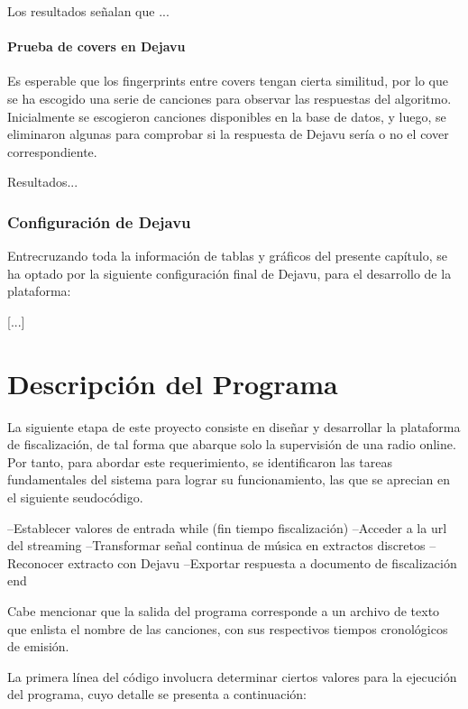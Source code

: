 Los resultados señalan que ... 

\paragraph{Prueba de covers en Dejavu}

Es esperable que los fingerprints entre covers tengan cierta similitud, por lo que se ha escogido una serie de canciones para observar las respuestas del algoritmo. Inicialmente se escogieron canciones disponibles en la base de datos, y luego, se eliminaron algunas para comprobar si la respuesta de Dejavu sería o no el cover correspondiente.

Resultados...

\subsubsection{Configuración de Dejavu}
Entrecruzando toda la información de tablas y gráficos del presente capítulo, se ha optado por la siguiente configuración final de Dejavu, para el desarrollo de la plataforma:

[...]


\section{Descripción del Programa}

La siguiente etapa de este proyecto consiste en diseñar y desarrollar la plataforma de fiscalización, de tal forma que abarque solo la supervisión de una radio online. Por tanto, para abordar este requerimiento, se identificaron las tareas fundamentales del sistema para lograr su funcionamiento, las que se aprecian en el siguiente seudocódigo.


--Establecer valores de entrada
while (fin tiempo fiscalización)
	--Acceder a la url del streaming
	--Transformar señal continua de música en extractos discretos
	--Reconocer extracto con Dejavu
	--Exportar respuesta a documento de fiscalización
end

Cabe mencionar que la salida del programa corresponde a un archivo de texto que enlista el nombre de las canciones, con sus respectivos tiempos cronológicos de emisión.

La primera línea del código involucra determinar ciertos valores para la ejecución del programa, cuyo detalle se presenta a continuación:

